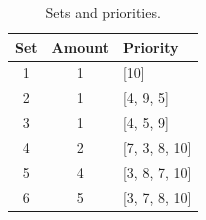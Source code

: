 \begin{table}[H]
\centering
\begin{tabular}{ccl}
\hline
\textbf{Set} & \textbf{Amount} & \textbf{Priority} \\ \hline
1            & 1               & {[}10{]}          \\ 
2            & 1               & {[}4, 9, 5{]}     \\
3            & 1               & {[}4, 5, 9{]}     \\
4            & 2               & {[}7, 3, 8, 10{]} \\
5            & 4               & {[}3, 8, 7, 10{]} \\
6            & 5               & {[}3, 7, 8, 10{]} \\
\hline
\end{tabular}
\caption{Sets and priorities.}
\label{tab:sets_priorities_opt}
\end{table}

